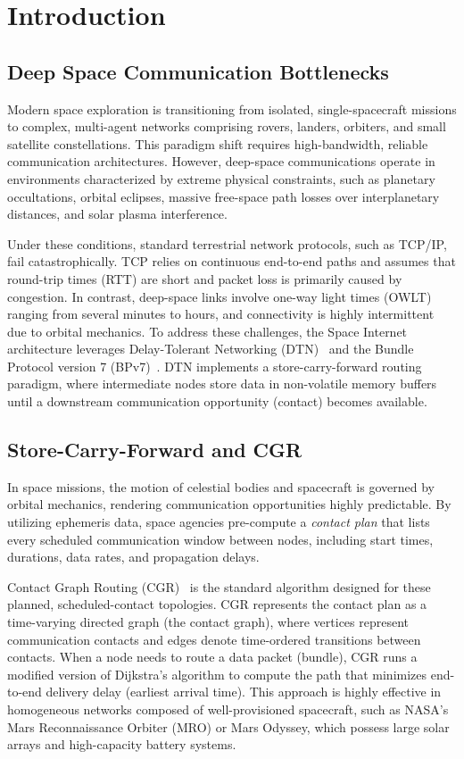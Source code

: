 \documentclass[journal,twocolumn]{IEEEtran}
\begin{document}
\section{Introduction}
\label{sec:intro}

\subsection{Deep Space Communication Bottlenecks}
Modern space exploration is transitioning from isolated, single-spacecraft missions to complex, multi-agent networks comprising rovers, landers, orbiters, and small satellite constellations. This paradigm shift requires high-bandwidth, reliable communication architectures. However, deep-space communications operate in environments characterized by extreme physical constraints, such as planetary occultations, orbital eclipses, massive free-space path losses over interplanetary distances, and solar plasma interference. 

Under these conditions, standard terrestrial network protocols, such as TCP/IP, fail catastrophically. TCP relies on continuous end-to-end paths and assumes that round-trip times (RTT) are short and packet loss is primarily caused by congestion. In contrast, deep-space links involve one-way light times (OWLT) ranging from several minutes to hours, and connectivity is highly intermittent due to orbital mechanics. To address these challenges, the Space Internet architecture leverages Delay-Tolerant Networking (DTN)~\cite{fall2003dtn,cerf2007dtn} and the Bundle Protocol version 7 (BPv7)~\cite{rfc9171}. DTN implements a store-carry-forward routing paradigm, where intermediate nodes store data in non-volatile memory buffers until a downstream communication opportunity (contact) becomes available.

\subsection{Store-Carry-Forward and CGR}
In space missions, the motion of celestial bodies and spacecraft is governed by orbital mechanics, rendering communication opportunities highly predictable. By utilizing ephemeris data, space agencies pre-compute a \emph{contact plan} that lists every scheduled communication window between nodes, including start times, durations, data rates, and propagation delays. 

Contact Graph Routing (CGR)~\cite{burleigh2010cgr} is the standard algorithm designed for these planned, scheduled-contact topologies. CGR represents the contact plan as a time-varying directed graph (the contact graph), where vertices represent communication contacts and edges denote time-ordered transitions between contacts. When a node needs to route a data packet (bundle), CGR runs a modified version of Dijkstra's algorithm to compute the path that minimizes end-to-end delivery delay (earliest arrival time). This approach is highly effective in homogeneous networks composed of well-provisioned spacecraft, such as NASA's Mars Reconnaissance Orbiter (MRO) or Mars Odyssey, which possess large solar arrays and high-capacity battery systems.
\end{document}
